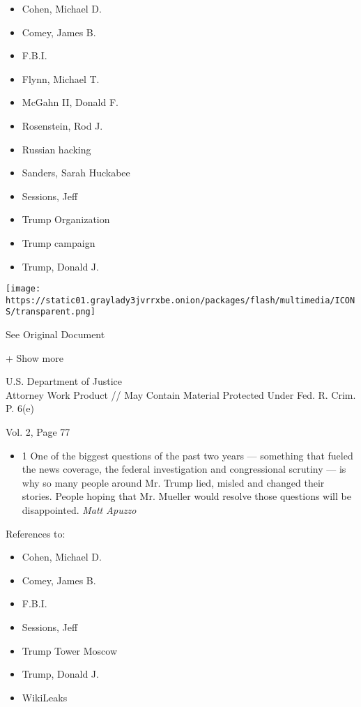 \begin{itemize}
\tightlist
\item
  Cohen, Michael D.
\item
  Comey, James B.
\item
  F.B.I.
\item
  Flynn, Michael T.
\item
  McGahn II, Donald F.
\item
  Rosenstein, Rod J.
\item
  Russian hacking
\item
  Sanders, Sarah Huckabee
\item
  Sessions, Jeff
\item
  Trump Organization
\item
  Trump campaign
\item
  Trump, Donald J.
\end{itemize}

\protect\hyperlink{}{}

\texttt{[image: https://static01.graylady3jvrrxbe.onion/packages/flash/multimedia/ICONS/transparent.png]}

See Original Document

+ Show more

U.S. Department of Justice\\
Attorney Work Product // May Contain Material Protected Under Fed. R.
Crim. P. 6(e)

Vol. 2, Page 77

\begin{itemize}
\tightlist
\item
  1 One of the biggest questions of the past two years --- something
  that fueled the news coverage, the federal investigation and
  congressional scrutiny --- is why so many people around Mr. Trump
  lied, misled and changed their stories. People hoping that Mr. Mueller
  would resolve those questions will be disappointed. \emph{Matt Apuzzo}
\end{itemize}

References to:

\begin{itemize}
\tightlist
\item
  Cohen, Michael D.
\item
  Comey, James B.
\item
  F.B.I.
\item
  Sessions, Jeff
\item
  Trump Tower Moscow
\item
  Trump, Donald J.
\item
  WikiLeaks
\end{itemize}

